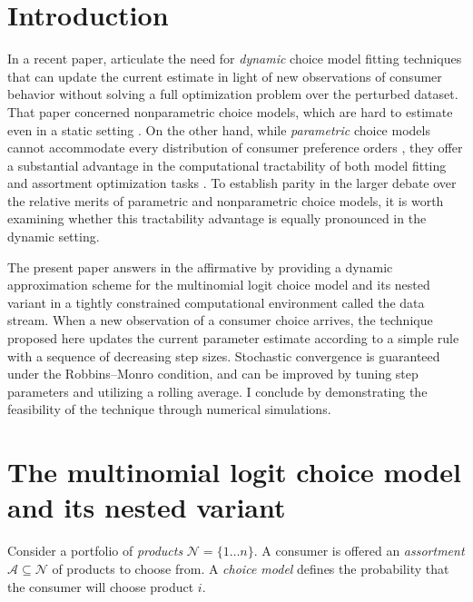 \documentclass[preprint,12pt,authoryear]{elsarticle}
\begin{document}


\section{Introduction}
In a recent paper, \cite{honguyen2021} articulate the need for \emph{dynamic} choice model fitting techniques that can update the current estimate in light of new observations of consumer behavior without solving a full optimization problem over the perturbed dataset. That paper concerned nonparametric choice models, which are hard to estimate even in a static setting \cite[][]{rusmevichientong2006, farias2013}. On the other hand, while \emph{parametric} choice models cannot accommodate every distribution of consumer preference orders \cite[][]{keane1997}, they offer a substantial advantage in the computational tractability of both model fitting and assortment optimization tasks \cite[][]{bunch1987, davis2014}. To establish parity in the larger debate over the relative merits of parametric and nonparametric choice models, it is worth examining whether this tractability advantage is equally pronounced in the dynamic setting. 

The present paper answers in the affirmative by providing a dynamic approximation scheme for the multinomial logit choice model and its nested variant in a tightly constrained computational environment called the data stream. When a new observation of a consumer choice arrives, the technique proposed here updates the current parameter estimate according to a simple rule with a sequence of decreasing step sizes. Stochastic convergence is guaranteed under the Robbins--Monro condition, and can be improved by tuning step parameters and utilizing a rolling average. I conclude by demonstrating the feasibility of the technique through numerical simulations. 

\section{The multinomial logit choice model and its nested variant}
Consider a portfolio of \emph{products} $\mathcal{N} = \{1 \dots n\}$. A consumer is offered an \emph{assortment} $\mathcal{A} \subseteq \mathcal{N}$ of products to choose from. A \emph{choice model} defines the probability that the consumer will choose product $i$.
\end{document}
